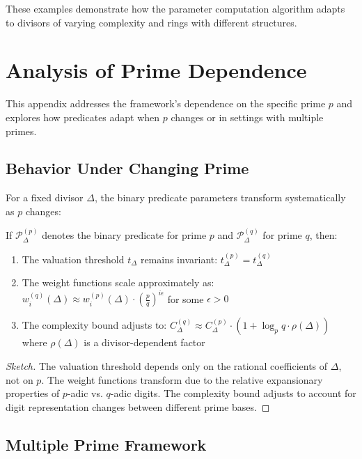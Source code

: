 These examples demonstrate how the parameter computation algorithm adapts to divisors of varying complexity and rings with different structures.

\section{Analysis of Prime Dependence}\label{app:prime-dependence}

This appendix addresses the framework's dependence on the specific prime $p$ and explores how predicates adapt when $p$ changes or in settings with multiple primes.

\subsection{Behavior Under Changing Prime}

For a fixed divisor $\Delta$, the binary predicate parameters transform systematically as $p$ changes:

\begin{proposition}
If $\mathcal{P}_\Delta^{(p)}$ denotes the binary predicate for prime $p$ and $\mathcal{P}_\Delta^{(q)}$ for prime $q$, then:
\begin{enumerate}
    \item The valuation threshold $t_\Delta$ remains invariant: $t_\Delta^{(p)} = t_\Delta^{(q)}$
    \item The weight functions scale approximately as: $w_i^{(q)}(\Delta) \approx w_i^{(p)}(\Delta) \cdot \left(\frac{p}{q}\right)^{i\epsilon}$ for some $\epsilon > 0$
    \item The complexity bound adjusts to: $C_\Delta^{(q)} \approx C_\Delta^{(p)} \cdot \left(1 + \log_p{q} \cdot \rho(\Delta)\right)$ where $\rho(\Delta)$ is a divisor-dependent factor
\end{enumerate}
\end{proposition}

\begin{proof}[Sketch]
The valuation threshold depends only on the rational coefficients of $\Delta$, not on $p$. The weight functions transform due to the relative expansionary properties of $p$-adic vs. $q$-adic digits. The complexity bound adjusts to account for digit representation changes between different prime bases.
\end{proof}

\subsection{Multiple Prime Framework}

